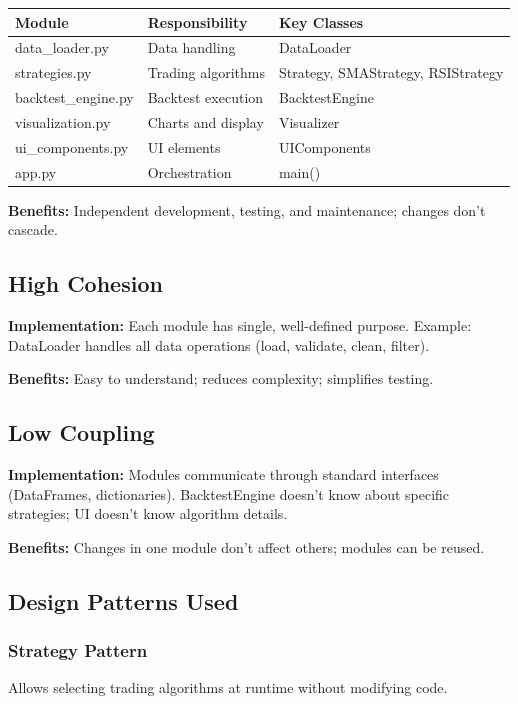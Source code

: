 \documentclass[11pt,a4paper]{article}
\begin{document}
\begin{table}[H]
\small
\centering
\begin{tabular}{|l|p{4cm}|p{3cm}|}
\hline
\textbf{Module} & \textbf{Responsibility} & \textbf{Key Classes} \\
\hline
data\_loader.py & Data handling & DataLoader \\
\hline
strategies.py & Trading algorithms & Strategy, SMAStrategy, RSIStrategy \\
\hline
backtest\_engine.py & Backtest execution & BacktestEngine \\
\hline
visualization.py & Charts and display & Visualizer \\
\hline
ui\_components.py & UI elements & UIComponents \\
\hline
app.py & Orchestration & main() \\
\hline
\end{tabular}
\end{table}

\textbf{Benefits:} Independent development, testing, and maintenance; changes don't cascade.

\subsection{High Cohesion}
\textbf{Implementation:} Each module has single, well-defined purpose. Example: DataLoader handles all data operations (load, validate, clean, filter).

\textbf{Benefits:} Easy to understand; reduces complexity; simplifies testing.

\subsection{Low Coupling}
\textbf{Implementation:} Modules communicate through standard interfaces (DataFrames, dictionaries). BacktestEngine doesn't know about specific strategies; UI doesn't know algorithm details.

\textbf{Benefits:} Changes in one module don't affect others; modules can be reused.

\subsection{Design Patterns Used}

\subsubsection{Strategy Pattern}
Allows selecting trading algorithms at runtime without modifying code.
\end{document}
